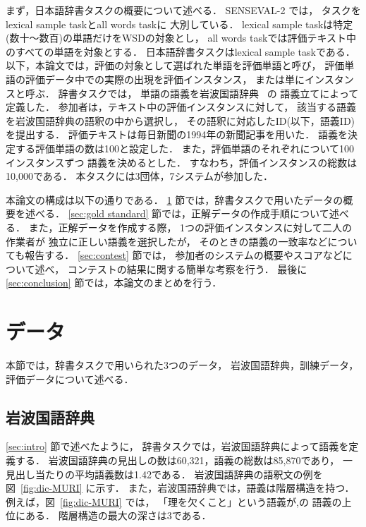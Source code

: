 まず，日本語辞書タスクの概要について述べる．
SENSEVAL-2 では，
タスクをlexical sample taskとall words taskに
大別している．
lexical sample taskは特定(数十〜数百)の単語だけをWSDの対象とし，
all words taskでは評価テキスト中のすべての単語を対象とする．
日本語辞書タスクはlexical sample taskである．
以下，本論文では，評価の対象として選ばれた単語を評価単語と呼び，
評価単語の評価データ中での実際の出現を評価インスタンス，
または単にインスタンスと呼ぶ．
辞書タスクでは，
単語の語義を岩波国語辞典~\cite{nisio:94:a} の
語義立てによって定義した．
参加者は，テキスト中の評価インスタンスに対して，
該当する語義を岩波国語辞典の語釈の中から選択し，
その語釈に対応したID(以下，語義ID)を提出する．
評価テキストは毎日新聞の1994年の新聞記事を用いた．
語義を決定する評価単語の数は100と設定した．
また，評価単語のそれぞれについて100インスタンスずつ
語義を決めるとした．
すなわち，評価インスタンスの総数は10,000である．
本タスクには3団体，7システムが参加した．

本論文の構成は以下の通りである．
\ref{sec:data} 節では，辞書タスクで用いたデータの概要を述べる．
\ref{sec:gold standard} 節では，正解データの作成手順について述べる．
また，正解データを作成する際，
1つの評価インスタンスに対して二人の作業者が
独立に正しい語義を選択したが，
そのときの語義の一致率などについても報告する．
\ref{sec:contest} 節では，
参加者のシステムの概要やスコアなどについて述べ，
コンテストの結果に関する簡単な考察を行う．
最後に\ref{sec:conclusion} 節では，本論文のまとめを行う．


\section{データ}
\label{sec:data}

本節では，辞書タスクで用いられた3つのデータ，
岩波国語辞典，訓練データ，評価データについて述べる．

\subsection{岩波国語辞典}
\label{sec:iwanami}

\ref{sec:intro} 節で述べたように，
辞書タスクでは，岩波国語辞典によって語義を定義する．
岩波国語辞典の見出しの数は60,321，語義の総数は85,870であり，
一見出し当たりの平均語義数は1.42である．
岩波国語辞典の語釈文の例を図~\ref{fig:dic-MURI} に示す．
また，岩波国語辞典では，語義は階層構造を持つ．
例えば，図~\ref{fig:dic-MURI} では，
「理を欠くこと」という語義が,の
語義の上位にある．
階層構造の最大の深さは3である．

